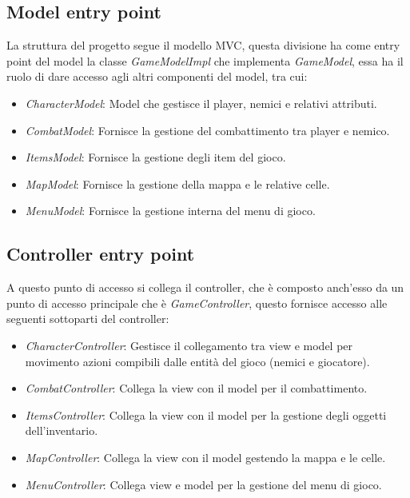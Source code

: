 \documentclass[a4paper,12pt]{report}
\begin{document}
\subsection{Model entry point}
La struttura del progetto segue il modello MVC, questa divisione ha come entry point del model la classe \textit{GameModelImpl} che implementa \textit{GameModel}, essa ha il ruolo di dare accesso agli altri componenti del model, tra cui:
\begin{itemize}
	\item \textit{CharacterModel}: Model che gestisce il player, nemici e relativi attributi.
	\item \textit{CombatModel}: Fornisce la gestione del combattimento tra player e nemico.
	\item \textit{ItemsModel}: Fornisce la gestione degli item del gioco.
	\item \textit{MapModel}: Fornisce la gestione della mappa e le relative celle.
	\item \textit{MenuModel}: Fornisce la gestione interna del menu di gioco.
\end{itemize}
\subsection{Controller entry point}
A questo punto di accesso si collega il controller, che è composto anch'esso da un punto di accesso principale che è \textit{GameController}, questo fornisce accesso alle seguenti sottoparti del controller:
\begin{itemize}
	\item \textit{CharacterController}: Gestisce il collegamento tra view e model per movimento azioni compibili dalle entità del gioco (nemici e giocatore).
	\item \textit{CombatController}: Collega la view con il model per il combattimento.
	\item \textit{ItemsController}: Collega la view con il model per la gestione degli oggetti dell'inventario.
	\item \textit{MapController}: Collega la view con il model gestendo la mappa e le celle.
	\item \textit{MenuController}: Collega view e model per la gestione del menu di gioco.
\end{itemize}
\end{document}
